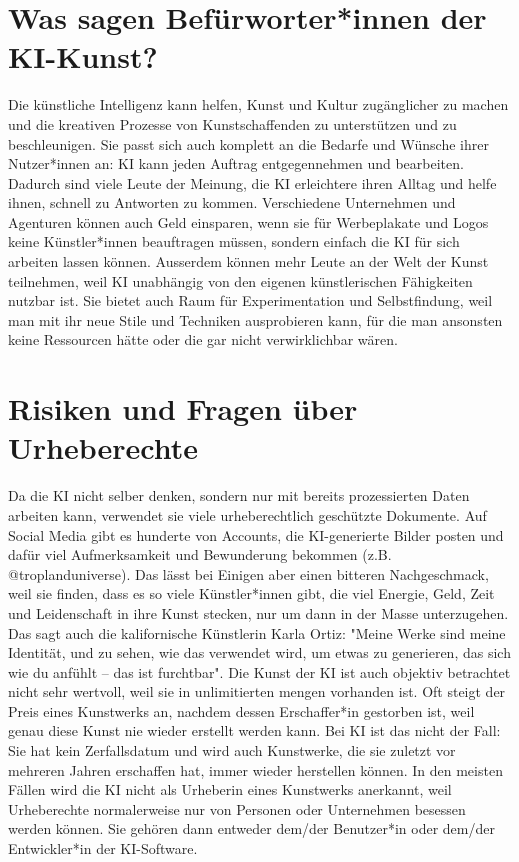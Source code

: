 \documentclass{article}
\begin{document}
\section{Was sagen Befürworter*innen der KI-Kunst?}
    Die künstliche Intelligenz kann helfen, Kunst und Kultur zugänglicher zu machen und die kreativen 
    Prozesse von Kunstschaffenden zu unterstützen und zu beschleunigen.  Sie passt sich auch komplett an die Bedarfe und Wünsche ihrer Nutzer*innen an: KI kann jeden Auftrag entgegennehmen und bearbeiten. Dadurch sind viele Leute der Meinung, die KI erleichtere ihren Alltag und helfe ihnen, schnell zu Antworten zu kommen.
    \newline Verschiedene Unternehmen und Agenturen können auch Geld einsparen, wenn sie für Werbeplakate und Logos keine Künstler*innen beauftragen müssen, sondern einfach die KI für sich arbeiten lassen können. Ausserdem können mehr Leute an der Welt der Kunst teilnehmen, weil KI unabhängig von den eigenen künstlerischen Fähigkeiten nutzbar ist. Sie bietet auch Raum für Experimentation und Selbstfindung, weil man mit ihr neue Stile und Techniken ausprobieren kann, für die man ansonsten keine Ressourcen hätte oder die gar nicht verwirklichbar wären.
    
\section{Risiken und Fragen über Urheberechte}
    Da die KI nicht selber denken, sondern nur mit bereits prozessierten Daten arbeiten kann, verwendet sie viele urheberechtlich geschützte Dokumente. Auf Social Media gibt es hunderte von Accounts, die KI-generierte Bilder posten und dafür viel Aufmerksamkeit und Bewunderung bekommen (z.B. @troplanduniverse). Das lässt bei Einigen aber einen bitteren Nachgeschmack, weil sie finden, dass es so viele Künstler*innen gibt, die viel Energie, Geld, Zeit und Leidenschaft in ihre Kunst stecken, nur um dann in der Masse unterzugehen. Das sagt auch die kalifornische Künstlerin Karla Ortiz: "Meine Werke sind meine Identität, und zu sehen, wie das verwendet wird, um etwas zu generieren, das sich wie du anfühlt – das ist furchtbar". 
    \newline Die Kunst der KI ist auch objektiv betrachtet nicht sehr wertvoll, weil sie in unlimitierten mengen vorhanden ist. Oft steigt der Preis eines Kunstwerks an, nachdem dessen Erschaffer*in gestorben ist, weil genau diese Kunst nie wieder erstellt werden kann. Bei KI ist das nicht der Fall: Sie hat kein Zerfallsdatum und wird auch Kunstwerke, die sie zuletzt vor mehreren Jahren erschaffen hat, immer wieder herstellen können.
    \newline In den meisten Fällen wird die KI nicht als Urheberin eines Kunstwerks anerkannt, weil Urheberechte normalerweise nur von Personen oder Unternehmen besessen werden können. Sie gehören dann entweder dem/der Benutzer*in oder dem/der Entwickler*in der KI-Software.
\end{document}
